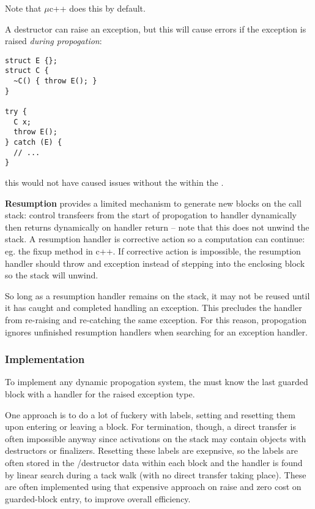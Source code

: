 \documentclass[12pt]{article}
\begin{document}
Note that $\mu$c++ does this by default.

A destructor can raise an exception, but this will cause errors if the exception is raised \textit{during propogation}:
\begin{verbatim}
struct E {};
struct C {
  ~C() { throw E(); }
}

try {
  C x;
  throw E();
} catch (E) {
  // ...
}
\end{verbatim}
this would not have caused issues without the  within the .

{\bf Resumption} provides a limited mechanism to generate new blocks on the call stack: control transfeers from the start of propogation to handler dynamically then returns dynamically on handler return -- note that this does not unwind the stack. A resumption handler is corrective action so a computation can continue: eg. the  fixup method in c++. If corrective action is impossible, the resumption handler should throw and exception instead of stepping into the enclosing block so the stack will unwind.

So long as a resumption handler remains on the stack, it may not be reused until it has caught and completed handling an exception. This precludes the handler from re-raising and re-catching the same exception. For this reason, propogation ignores unfinished resumption handlers when searching for an exception handler.

\subsubsection{Implementation}
To implement any dynamic propogation system, the  must know the last guarded block with a handler for the raised exception type.

One approach is to do a lot of fuckery with labels, setting and resetting them upon entering or leaving a block. For termination, though, a direct transfer is often impossible anyway since activations on the stack may contain objects with destructors or finalizers. Resetting these labels are exepnsive, so the labels are often stored in the /destructor data within each block and the handler is found by linear search during a tack walk (with no direct transfer taking place). These are often implemented using that expensive approach on raise and zero cost on guarded-block entry, to improve overall efficiency.
\end{document}
